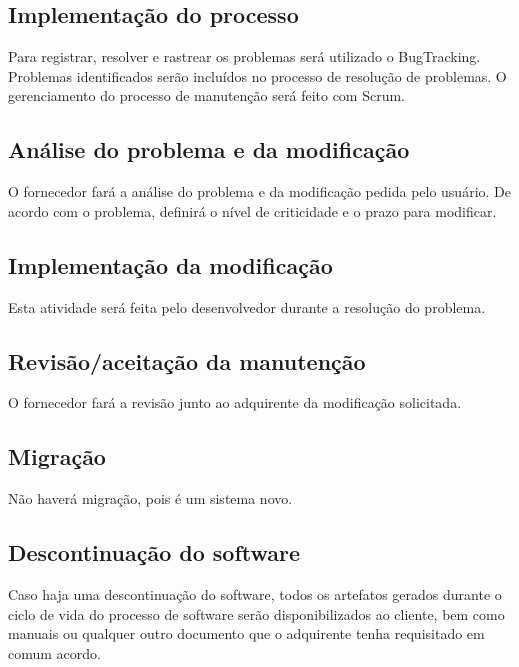\subsection{Implementação do processo}
Para registrar, resolver e rastrear os problemas será utilizado o BugTracking. Problemas identificados serão incluídos no processo de resolução de problemas. O gerenciamento do processo de manutenção será feito com Scrum.

\subsection{Análise do problema e da modificação}

O fornecedor fará a análise do problema e da modificação pedida pelo usuário. De acordo com o problema, definirá o nível de criticidade e o prazo para modificar.

\subsection{Implementação da modificação}

Esta atividade será feita pelo desenvolvedor durante a resolução do problema.

\subsection{Revisão/aceitação da manutenção}

O fornecedor fará a revisão junto ao adquirente da modificação solicitada.

\subsection{Migração}

Não haverá migração, pois é um sistema novo.

\subsection{Descontinuação do software}

Caso haja uma descontinuação do software, todos os artefatos gerados durante o ciclo de vida do processo de software serão disponibilizados ao cliente, bem como manuais ou qualquer outro documento que o adquirente tenha requisitado em comum acordo.












